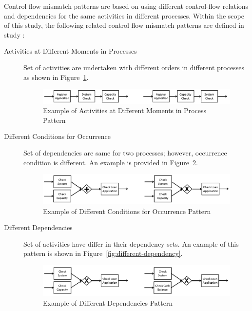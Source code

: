 Control flow mismatch patterns are based on using different control-flow relations and dependencies for the same activities in different processes. Within the scope of this study, the following related control flow mismatch patterns are defined in study \cite{dijkman2007mismatch}:
\begin{description}
  \item[Activities at Different Moments in Processes] Set of activities are undertaken with different orders in different processes as shown in Figure~\ref{fig:different-moments}. 
      \begin{figure}
      \centering
      \includegraphics[width=\textwidth]{3_background/mismatch-patterns-different-moments}
      \caption{Example of Activities at Different Moments in Process Pattern}
      \label{fig:different-moments}
      \end{figure}
  \item[Different Conditions for Occurrence] Set of dependencies are same for two processes; however, occurrence condition is different. An example is provided in Figure~\ref{fig:different-conditions}.
      \begin{figure}
      \centering
      \includegraphics[width=\textwidth]{3_background/mismatch-patterns-different-conditions}
      \caption{Example of Different Conditions for Occurrence Pattern}
      \label{fig:different-conditions}
      \end{figure}
  \item[Different Dependencies] Set of activities have differ in their dependency sets. An example of this pattern is shown in Figure~\ref{fig:different-dependency}.
      \begin{figure}
      \centering
      \includegraphics[width=\textwidth]{3_background/mismatch-patterns-different-dependency}
      \caption{Example of Different Dependencies Pattern}

\end{figure}
\end{description}
